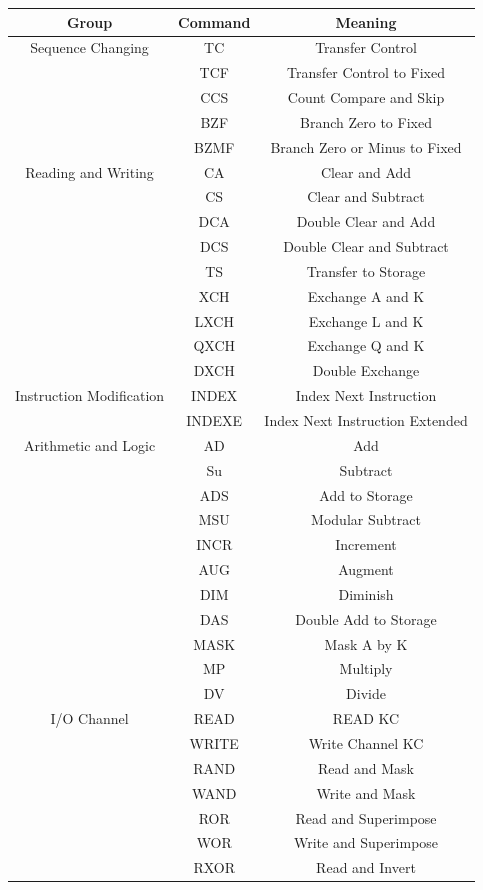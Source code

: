 \documentclass[a4paper,11pt]{article}
\begin{document}
\begin{center}
\begin{tabular}{| c | c | c |}
  \hline	
  	Group & Command & Meaning \\ \hline \hline
	Sequence Changing & TC & Transfer Control \\ \hline
	& TCF & Transfer Control to Fixed \\ \hline
	& CCS & Count Compare and Skip \\ \hline
	& BZF & Branch Zero to Fixed \\ \hline
	& BZMF & Branch Zero or Minus to Fixed \\ \hline
	
	Reading and Writing & CA & Clear and Add \\ \hline
	& CS & Clear and Subtract \\ \hline
	& DCA & Double Clear and Add \\ \hline
	& DCS & Double Clear and Subtract \\ \hline
	& TS & Transfer to Storage \\ \hline
	& XCH & Exchange A and K \\ \hline
	& LXCH & Exchange L and K \\ \hline
	& QXCH & Exchange Q and K \\ \hline
	& DXCH & Double Exchange \\ \hline
	
	Instruction Modification & INDEX & Index Next Instruction \\ \hline
	& INDEXE & Index Next Instruction Extended \\ \hline
	
	Arithmetic and Logic & AD & Add \\ \hline
	& Su & Subtract \\ \hline
	& ADS & Add to Storage \\ \hline
	& MSU & Modular Subtract \\ \hline
	& INCR & Increment \\ \hline
	& AUG & Augment \\ \hline
	& DIM & Diminish \\ \hline
	& DAS & Double Add to Storage \\ \hline
	& MASK & Mask A by K \\ \hline
	& MP & Multiply \\ \hline
	& DV & Divide \\ \hline

	I/O Channel & READ & READ KC \\ \hline
	& WRITE & Write Channel KC \\ \hline
	& RAND & Read and Mask \\ \hline
	& WAND & Write and Mask \\ \hline
	& ROR & Read and Superimpose \\ \hline
	& WOR & Write and Superimpose \\ \hline
	& RXOR & Read and Invert \\ \hline


\end{tabular}
\end{center}
\end{document}
